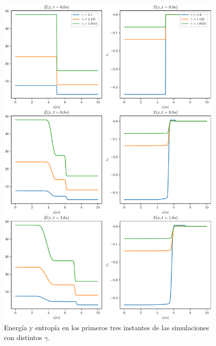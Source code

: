 \begin{figure}[H]
	\includegraphics[width=\linewidth]{../euler1D/experimentos/energia/1.pdf}
	\caption{Energía y entropía en los primeros tres instantes de las simulaciones con distintos $\gamma$.}
	\label{fig:ee-gammas-1}
\end{figure}
